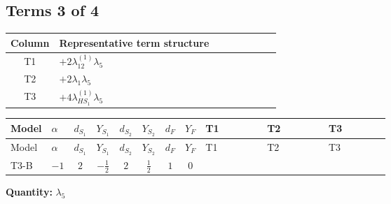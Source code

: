 \documentclass[8pt]{article}
\begin{document}
\begin{landscape}
\subsection*{Terms 3 of 4}
\begin{center}
\begin{tabular}{@{}c >{\raggedright\arraybackslash}p{0.82\linewidth}@{}}
\toprule
Column & Representative term structure \\
\midrule
T1 & \(\displaystyle +2 {\lambda_{12}^{(1)}} {\lambda_5}\) \\
\midrule
T2 & \(\displaystyle +2 {\lambda_1} {\lambda_5}\) \\
\midrule
T3 & \(\displaystyle +4 {\lambda_{HS_1}^{(1)}} {\lambda_5}\) \\
\midrule
\bottomrule
\end{tabular}
\end{center}
\smallskip
\tiny
\begin{longtable}{@{}llcccccc >{\raggedright\arraybackslash}p{0.21\linewidth} >{\raggedright\arraybackslash}p{0.21\linewidth} >{\raggedright\arraybackslash}p{0.21\linewidth}@{}}
\toprule
Model & $\alpha$ & $d_{S_1}$ & $Y_{S_1}$ & $d_{S_2}$ & $Y_{S_2}$ & $d_F$ & $Y_F$ & T1 & T2 & T3 \\
\midrule
\endfirsthead
\toprule
Model & $\alpha$ & $d_{S_1}$ & $Y_{S_1}$ & $d_{S_2}$ & $Y_{S_2}$ & $d_F$ & $Y_F$ & T1 & T2 & T3 \\
\midrule
\endhead
T3-B & $-1$ & $2$ & $-\frac{1}{2}$ & $2$ & $\frac{1}{2}$ & $1$ & $0$ & \scriptsize\adjustbox{max width=\linewidth}{$\begin{gathered} +2 {\lambda_{12}^{(1)}} {\lambda_5}\end{gathered}$} & \scriptsize\adjustbox{max width=\linewidth}{$\begin{gathered} +2 {\lambda_1} {\lambda_5}\end{gathered}$} & \scriptsize\adjustbox{max width=\linewidth}{$\begin{gathered} +4 {\lambda_{HS_1}^{(1)}} {\lambda_5}\end{gathered}$} \\
\midrule
\bottomrule
\end{longtable}
\clearpage
\noindent\textbf{Quantity: }$\lambda_5$\par\smallskip

\end{landscape}
\end{document}
